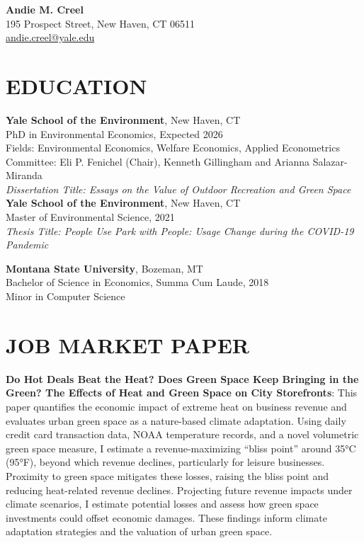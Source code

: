 \documentclass[11pt]{article}
\begin{document}
\begin{center}
    \textbf{\Huge Andie M. Creel} \\
    195 Prospect Street, New Haven, CT 06511 \\
    \href{mailto:andie.creel@yale.edu}{andie.creel@yale.edu}
\end{center}

\section*{EDUCATION}
\textbf{Yale School of the Environment}, New Haven, CT \\
PhD in Environmental Economics, Expected 2026 \\
Fields: Environmental Economics, Welfare Economics, Applied Econometrics\\
Committee: Eli P. Fenichel (Chair), Kenneth Gillingham and Arianna Salazar-Miranda \\
\textit{Dissertation Title: Essays on the Value of Outdoor Recreation and Green Space}\\


\textbf{Yale School of the Environment}, New Haven, CT \\
Master of Environmental Science, 2021 \\
\textit{Thesis Title: People Use Park with People: Usage Change during the COVID-19 Pandemic}

\textbf{Montana State University}, Bozeman, MT \\
Bachelor of Science in Economics, Summa Cum Laude, 2018 \\
Minor in Computer Science

\section*{JOB MARKET PAPER}
\textbf{Do Hot Deals Beat the Heat? Does Green Space Keep Bringing in the Green? The Effects of Heat and Green Space on City Storefronts}: This paper quantifies the economic impact of extreme heat on business revenue and evaluates urban green space as a nature-based climate adaptation. Using daily credit card transaction data, NOAA temperature records, and a novel volumetric green space measure, I estimate a revenue-maximizing “bliss point” around 35°C (95°F), beyond which revenue declines, particularly for leisure businesses. Proximity to green space mitigates these losses, raising the bliss point and reducing heat-related revenue declines. Projecting future revenue impacts under climate scenarios, I estimate potential losses and assess how green space investments could offset economic damages. These findings inform climate adaptation strategies and the valuation of urban green space.
\end{document}
